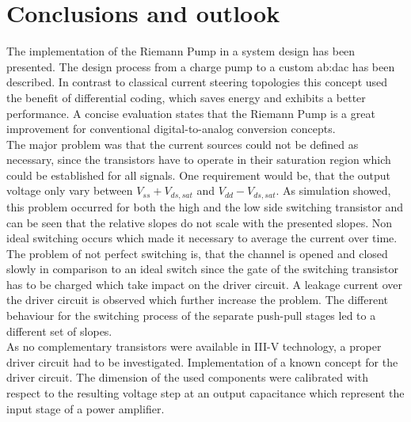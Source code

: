 \chapter{Conclusions and outlook}

The implementation of the Riemann Pump in a system design has been presented.
The design process from a charge pump to a custom \gls{ab:dac} has been described.
In contrast to classical current steering topologies this concept used the benefit of differential coding, which saves energy and exhibits a better performance.
A concise evaluation states that the Riemann Pump is a great improvement for conventional digital-to-analog conversion concepts.\\
The major problem was that the current sources could not be defined as necessary, since the transistors have to operate in their saturation region which could be established for all signals.
One requirement would be, that the output voltage only vary between $V_{ss} + V_{ds,sat}$ and $V_{dd} - V_{ds,sat}$.
As simulation showed, this problem occurred for both the high and the low side switching transistor and can be seen that the relative slopes do not scale with the presented slopes.
Non ideal switching occurs which made it necessary to average the current over time.
The problem of not perfect switching is, that the channel is opened and closed slowly in comparison to an ideal switch since the gate of the switching transistor has to be charged which take impact on the driver circuit.
A leakage current over the driver circuit is observed which further increase the problem.
The different behaviour for the switching process of the separate push-pull stages led to a different set of slopes. \\
As no complementary transistors were available in III-V technology, a proper driver circuit had to be investigated.
Implementation of a known concept \cite{MaksimovicPaper} for the driver circuit.
The dimension of the used components were calibrated with respect to the resulting voltage step at an output capacitance which represent the input stage of a power amplifier.
